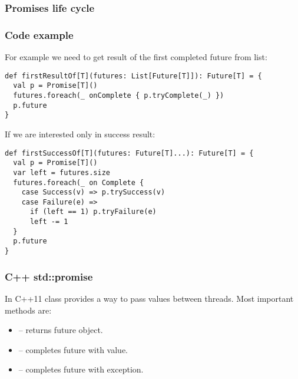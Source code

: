 \begin{frame}[fragile]
\frametitle{Promises life cycle}
\end{frame}

\begin{frame}[fragile]
\frametitle{Code example}
For example we need to get result of the first completed future from list:
\begin{lstlisting}
def firstResultOf[T](futures: List[Future[T]]): Future[T] = {
  val p = Promise[T]()
  futures.foreach(_ onComplete { p.tryComplete(_) })
  p.future
}
\end{lstlisting}
If we are interested only in success result:
\begin{lstlisting}
def firstSuccessOf[T](futures: Future[T]...): Future[T] = {
  val p = Promise[T]()
  var left = futures.size
  futures.foreach(_ on Complete {
    case Success(v) => p.trySuccess(v)
    case Failure(e) =>
      if (left == 1) p.tryFailure(e)
      left -= 1
  }
  p.future
}
\end{lstlisting}
\end{frame}

\begin{frame}[fragile]
\frametitle{C++ std::promise}
In C++11  class provides a way to pass values between threads.
Most important methods are:
\begin{itemize}
\item {} -- returns future object.
\item {} -- completes future with value.
\item {} -- completes future with exception.
\end{itemize}
\end{frame}

